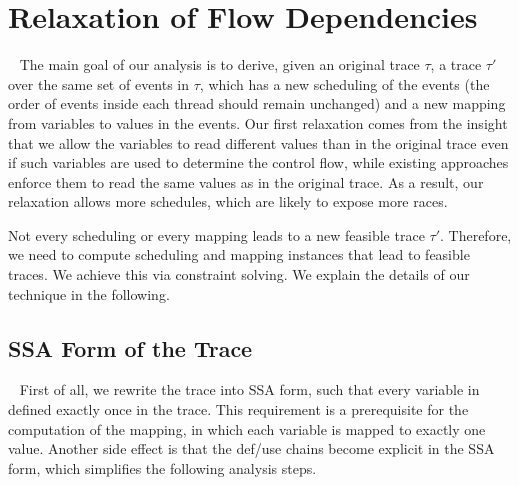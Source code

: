 \section{Relaxation of Flow Dependencies}~\label{sec:relax1}
The main goal of our analysis is to derive, given an original trace $\tau$, a trace $\tau'$ over the same set of events in $\tau$, which has a new scheduling  of the events (the order of events inside each thread should remain unchanged) and a new mapping from variables to values in the events. Our first relaxation comes from the insight that we allow the variables to read different values than in the original trace even if such variables are used to determine the control flow, while existing approaches enforce them to read the same values as in the original trace. As a result, our relaxation allows more schedules, which are likely to expose more races.
 
Not every scheduling or every mapping  leads to a new feasible trace $\tau'$. Therefore, we need to compute scheduling and mapping instances that lead to feasible traces. We achieve this via constraint solving. We explain the details of our technique in the following.





\subsection{SSA Form of the Trace}~\label{sec:ssa}
First of all, we rewrite the trace into SSA form, such that every variable in defined exactly once in the trace. This requirement is a prerequisite for the computation of the mapping, in which each variable is mapped to exactly one value. Another side effect is that the def/use chains become explicit in the SSA form, which simplifies the following analysis steps.


